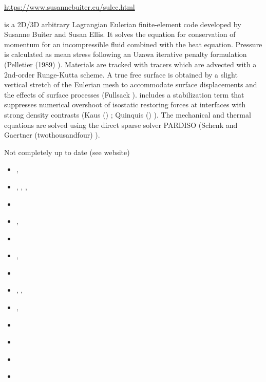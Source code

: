 \url{https://www.susannebuiter.eu/sulec.html}

\sulec is a 2D/3D arbitrary Lagrangian Eulerian finite-element 
code developed by Susanne Buiter and Susan Ellis. 
It solves the equation for conservation of momentum for an incompressible fluid combined with 
the heat equation. Pressure is calculated as mean stress following an Uzawa iterative penalty 
formulation (Pelletier \etal (1989) \cite{pefc89}). 
Materials are tracked with tracers which are advected with a 2nd-order Runge-Kutta scheme. 
A true free surface is obtained by a slight vertical stretch of the Eulerian mesh to 
accommodate surface displacements and the effects of surface processes (Fullsack \nineteenninetyfive \cite{full95}). 
\sulec includes a stabilization term that suppresses numerical overshoot of isostatic restoring forces 
at interfaces with strong density contrasts (Kaus \etal (\twothousandten) \cite{kamm10}; 
Quinquis \etal (\twothousandeleven) \cite{qube11}). The mechanical and thermal equations are solved using 
the direct sparse solver PARDISO (Schenk and Gaertner (twothousandfour) \cite{scga04}).

Not completely up to date (see website)
\begin{small}
\begin{itemize}
\item[\twothousandeleven]     \textcite{qube11}, \textcite{ellw11}
\item[\twothousandtwelve]     \textcite{buit12}, \textcite{tebu12},
                              \textcite{crsg12}, \textcite{grel12}
\item[\twothousandthirteen]   \textcite{ghbu13}
\item[\twothousandfourteen]   \textcite{ghbu14}, \textcite{qubu14}
\item[\twothousandfifteen]    \textcite{nabu15}
\item[\twothousandsixteen]    \textcite{zwsn16}, \textcite{elwr16}
\item[\twothousandseventeen]  \textcite{nabp17}
\item[\twothousandeighteen]   \textcite{tebu18}, \textcite{fade18},  \textcite{weef18}
\item[\twothousandnineteen]   \textcite{elgb19}, \textcite{biem19}
\item[\twothousandtwenty]     \textcite{pena20}
\item[\twothousandtwentytwo]  \textcite{pefb22} 
\item[\twothousandtwentyfour] \textcite{hube24} 
\item[\twothousandtwentyfive] \textcite{erbt25}
\end{itemize}
\end{small}


